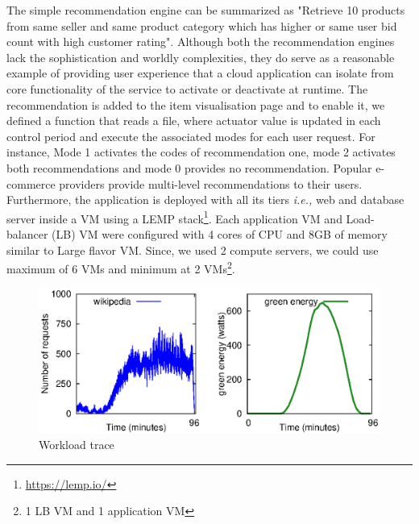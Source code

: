 The
simple recommendation engine can be summarized as "Retrieve 10 products from same seller and same product category which has higher or same user bid count with high customer rating". Although both the
recommendation engines lack the sophistication and worldly complexities, they do
serve as a reasonable example of providing user experience that a cloud
application can isolate from core functionality of the service 
to activate or
deactivate at runtime. The recommendation is added
to the item visualisation page and to enable it, we defined
a function that reads a file, where actuator value is updated
in each control period and execute the associated modes for
each user request. For instance, Mode 1 activates the codes of
recommendation one, mode 2 activates both recommendations
and mode 0 provides no recommendation. Popular e-commerce providers provide multi-level recommendations to their users. Furthermore, the application is deployed with all its tiers \emph{i.e.,} web and database server inside a VM using a LEMP stack\footnote{\url{https://lemp.io/}}. Each application VM and Load-balancer (LB) VM were configured with 4 cores of CPU and 8GB of memory similar to Large flavor VM. Since, we used 2 compute servers, we could use maximum of 6 VMs and minimum at 2 VMs\footnote{1 LB VM and 1 application VM}. 

\begin{figure}[h]
\includegraphics[scale=.65]{Graphs/workload_ucc.eps}
\caption{Workload trace}
\label{fig:workload} 
\end{figure}

